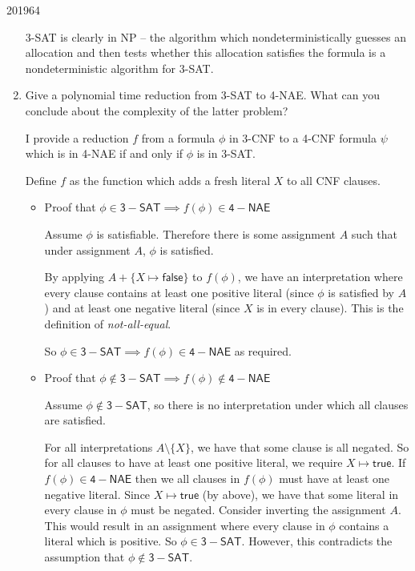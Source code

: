 \documentclass[10pt,\jkfside,a4paper]{article}
\begin{document}
\begin{examquestion}{2019}{6}{4}
\begin{enumerate}[label=(\alph*)]
3-SAT is clearly in NP -- the algorithm which nondeterministically guesses
an allocation and then tests whether this allocation satisfies the formula
is a nondeterministic algorithm for 3-SAT\@.

\item Give a polynomial time reduction from 3-SAT to 4-NAE. What can you
conclude about the complexity of the latter problem?

I provide a reduction $f$ from a formula $\phi$ in 3-CNF to a 4-CNF formula
$\psi$ which is in 4-NAE if and only if $\phi$ is in 3-SAT\@.

Define $f$ as the function which adds a fresh literal $X$ to all CNF clauses.

\begin{itemize}

\item Proof that $\phi \in \mathsf{3-SAT} \implies f(\phi) \in \mathsf{4-NAE}$

Assume $\phi$ is satisfiable. Therefore there is some assignment $A$ such
that under assignment $A$, $\phi$ is satisfied.

By applying $A + \{X \mapsto \mathsf{false}\}$ to $f(\phi)$, we have an
interpretation where every clause contains at least one positive literal
(since $\phi$ is satisfied by $A$) and at least one negative literal (since
$X$ is in every clause). This is the definition of \textit{not-all-equal}.

So $\phi \in \mathsf{3-SAT} \implies f(\phi) \in \mathsf{4-NAE}$ as required.

\item Proof that $\phi \notin \mathsf{3-SAT} \implies f(\phi) \notin \mathsf{4-NAE}$

Assume $\phi \notin \mathsf{3-SAT}$, so there is no interpretation under
which all clauses are satisfied.

For all interpretations $A \setminus \{X\}$, we have that some clause is
all negated. So for all clauses to have at least one positive literal, we
require $X \mapsto \mathsf{true}$. If $f(\phi) \in \mathsf{4-NAE}$ then we
all clauses in $f(\phi)$ must have at least one negative literal. Since
$X \mapsto \mathsf{true}$ (by above), we have that some literal in every
clause in $\phi$ must be negated. Consider inverting the assignment $A$.
This would result in an assignment where every clause in $\phi$ contains a
literal which is positive. So $\phi \in \mathsf{3-SAT}$. However, this
contradicts the assumption that $\phi \notin \mathsf{3-SAT}$.


\end{itemize}
\end{enumerate}
\end{examquestion}
\end{document}
